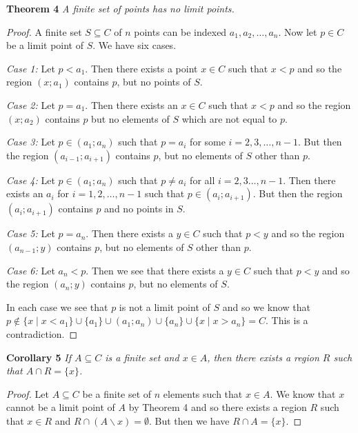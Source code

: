 \documentclass{article}
\begin{document}
\begin{flushleft}
\textbf{Theorem 4}
\textsl{A finite set of points has no limit points.}
\begin{proof}
A finite set $S \subseteq C$ of $n$ points can be indexed $a_1,a_2, \dots ,a_n$. Now let $p \in C$ be a limit point of $S$. We have six cases.\newline

\textsl{Case 1:} Let $p<a_1$. Then there exists a point $x \in C$ such that $x<p$ and so the region $(x;a_1)$ contains $p$, but no points of $S$.\newline

\textsl{Case 2:} Let $p=a_1$. Then there exists an $x \in C$ such that $x<p$ and so the region $(x;a_2)$ contains $p$ but no elements of $S$ which are not equal to $p$.\newline

\textsl{Case 3:} Let $p \in (a_1;a_n)$ such that $p=a_i$ for some $i=2,3, \dots ,n-1$. But then the region $(a_{i-1};a_{i+1})$ contains $p$, but no elements of $S$ other than $p$.\newline

\textsl{Case 4:} Let $p \in (a_1;a_n)$ such that $p \neq a_i$ for all $i=2,3 \dots ,n-1$. Then there exists an $a_i$ for $i=1,2, \dots ,n-1$ such that $p \in (a_i;a_{i+1})$. But then the region $(a_i;a_{i+1})$ contains $p$ and no points in $S$.\newline

\textsl{Case 5:} Let $p=a_n$. Then there exists a $y \in C$ such that $p<y$ and so the region $(a_{n-1};y)$ contains $p$, but no elements of $S$ other than $p$.\newline

\textsl{Case 6:} Let $a_n<p$. Then we see that there exists a $y \in C$ such that $p<y$ and so the region $(a_n;y)$ contains $p$, but no elements of $S$.\newline

In each case we see that $p$ is not a limit point of $S$ and so we know that $p \notin \{x \mid x<a_1\} \cup \{a_1\} \cup (a_1;a_n) \cup \{a_n\} \cup \{x \mid x>a_n\} = C$. This is a contradiction.
\end{proof}

\textbf{Corollary 5}
\textsl{If $A \subseteq C$ is a finite set and $x \in A$, then there exists a region $R$ such that $A \cap R = \{x\}$.}
\begin{proof}
Let $A \subseteq C$ be a finite set of $n$ elements such that $x \in A$. We know that $x$ cannot be a limit point of $A$ by Theorem 4 and so there exists a region $R$ such that $x \in R$ and $R \cap (A \backslash x) = \emptyset$. But then we have $R \cap A = \{x\}$.
\end{proof}


\end{flushleft}
\end{document}
